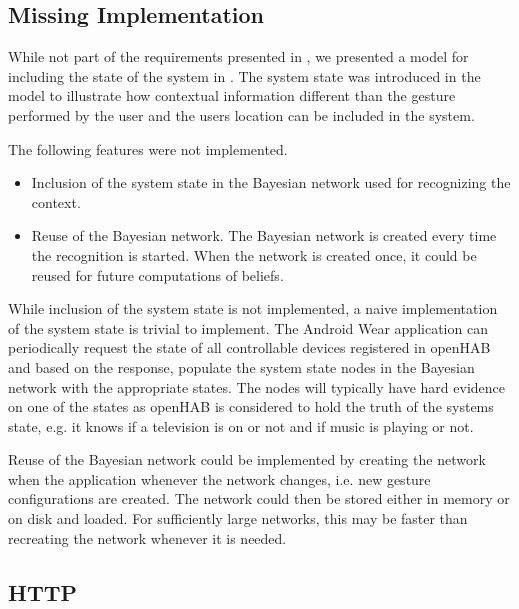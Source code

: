 \subsection{Missing Implementation}

While not part of the requirements presented in , we presented a model for including the state of the system in . The system state was introduced in the model to illustrate how contextual information different than the gesture performed by the user and the users location can be included in the system.

The following features were not implemented.

\begin{itemize}
\item Inclusion of the system state in the Bayesian network used for recognizing the context.
\item Reuse of the Bayesian network. The Bayesian network is created every time the recognition is started. When the network is created once, it could be reused for future computations of beliefs.
\end{itemize}

While inclusion of the system state is not implemented, a naive implementation of the system state is trivial to implement. The Android Wear application can periodically request the state of all controllable devices registered in openHAB and based on the response, populate the system state nodes in the Bayesian network with the appropriate states. The nodes will typically have hard evidence on one of the states as openHAB is considered to hold the truth of the systems state, e.g. it knows if a television is on or not and if music is playing or not.

Reuse of the Bayesian network could be implemented by creating the network when the application whenever the network changes, i.e. new gesture configurations are created. The network could then be stored either in memory or on disk and loaded. For sufficiently large networks, this may be faster than recreating the network whenever it is needed.

\subsection{HTTP}

